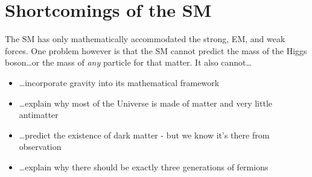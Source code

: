 \section{Shortcomings of the SM}
\label{sec:shortcomings}
The SM has only mathematically accommodated the strong, EM, and weak forces.
One problem however is that the SM cannot predict the mass of the Higgs boson\ldots or the mass of \emph{any} particle for that matter.
It also cannot\ldots
\begin{itemize}
    \item \ldots incorporate gravity into its mathematical framework
    \item \ldots explain why most of the Universe is made of matter and very little antimatter
    \item \ldots predict the existence of dark matter - but we know it's there from observation
    \item \ldots explain why there should be exactly three generations of fermions
\end{itemize}





